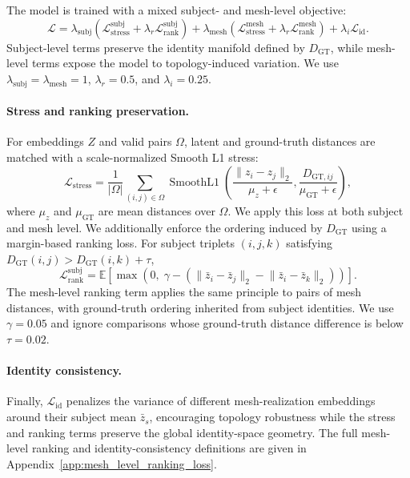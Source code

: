\documentclass{article}
\begin{document}
The model is trained with a mixed subject- and mesh-level objective:
\begin{equation}
\mathcal L =
\lambda_{\mathrm{subj}}
\left(
\mathcal L^{\mathrm{subj}}_{\mathrm{stress}}
+
\lambda_r \mathcal L^{\mathrm{subj}}_{\mathrm{rank}}
\right)
+
\lambda_{\mathrm{mesh}}
\left(
\mathcal L^{\mathrm{mesh}}_{\mathrm{stress}}
+
\lambda_r \mathcal L^{\mathrm{mesh}}_{\mathrm{rank}}
\right)
+
\lambda_i \mathcal L_{\mathrm{id}} .
\end{equation}
Subject-level terms preserve the identity manifold defined by $D_{\mathrm{GT}}$,
while mesh-level terms expose the model to topology-induced variation. We use
$\lambda_{\mathrm{subj}}=\lambda_{\mathrm{mesh}}=1$, $\lambda_r=0.5$, and
$\lambda_i=0.25$.

\paragraph{Stress and ranking preservation.}
For embeddings $Z$ and valid pairs $\Omega$, latent and ground-truth distances
are matched with a scale-normalized Smooth L1 stress:
\begin{equation}
\mathcal L_{\mathrm{stress}}
=
\frac{1}{|\Omega|}
\sum_{(i,j)\in\Omega}
\operatorname{SmoothL1}
\left(
\frac{\lVert z_i-z_j\rVert_2}{\mu_z+\epsilon},
\frac{D_{\mathrm{GT},ij}}{\mu_{\mathrm{GT}}+\epsilon}
\right),
\end{equation}
where $\mu_z$ and $\mu_{\mathrm{GT}}$ are mean distances over $\Omega$. We apply
this loss at both subject and mesh level. We additionally enforce the ordering
induced by $D_{\mathrm{GT}}$ using a margin-based ranking loss. For subject
triplets $(i,j,k)$ satisfying
$D_{\mathrm{GT}}(i,j)>D_{\mathrm{GT}}(i,k)+\tau$,
\begin{equation}
\mathcal L^{\mathrm{subj}}_{\mathrm{rank}}
=
\mathbb E
\left[
\max
\left(
0,\;
\gamma -
\left(
\lVert \bar z_i-\bar z_j\rVert_2
-
\lVert \bar z_i-\bar z_k\rVert_2
\right)
\right)
\right].
\end{equation}
The mesh-level ranking term applies the same principle to pairs of mesh
distances, with ground-truth ordering inherited from subject identities. We use
$\gamma=0.05$ and ignore comparisons whose ground-truth distance difference is
below $\tau=0.02$.

\paragraph{Identity consistency.}
Finally, $\mathcal L_{\mathrm{id}}$ penalizes the variance of different
mesh-realization embeddings around their subject mean $\bar z_s$, encouraging
topology robustness while the stress and ranking terms preserve the global
identity-space geometry. The full mesh-level ranking and identity-consistency
definitions are given in Appendix~\ref{app:mesh_level_ranking_loss}.
\end{document}
